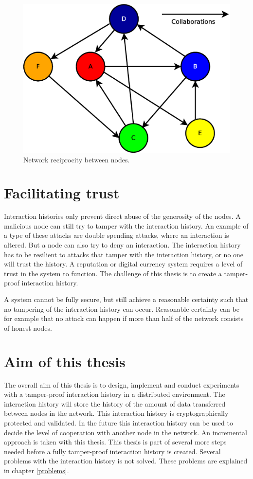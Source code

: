 \begin{figure}
	\centerline{\includegraphics[scale=0.3]{problemDescription/figs/network-reciprocity.eps}}
	\caption{Network reciprocity between nodes.}
	\label{fig:network-reciprocity}
\end{figure}

\section{Facilitating trust}
Interaction histories only prevent direct abuse of the generosity of the nodes.
A malicious node can still try to tamper with the interaction history.
An example of a type of these attacks are double spending attacks\cite{Nakamoto-bitcoin},
where an interaction is altered.
But a node can also try to deny an interaction.
The interaction history has to be resilient to attacks that tamper with the interaction history,
or no one will trust the history. 
A reputation or digital currency system requires a level of trust in the system to function.
The challenge of this thesis is to create a tamper-proof interaction history.

A system cannot be fully secure, 
but still achieve a reasonable certainty such that no tampering of the interaction history can occur.
Reasonable certainty can be for example that no attack can happen
if more than half of the network consists of honest nodes.

\section{Aim of this thesis}
\label{pb-aim}
The overall aim of this thesis is to design, implement and conduct experiments with a tamper-proof interaction history
in a distributed environment.
The interaction history will store the history of the amount of data transferred between nodes in the network.
This interaction history is cryptographically protected and validated.
In the future this interaction history can be used to decide the level of cooperation with another node in the network.
An incremental approach is taken with this thesis.
This thesis is part of several more steps needed before a fully tamper-proof interaction history is created.
Several problems with the interaction history is not solved.
These problems are explained in chapter \ref{problems}.
